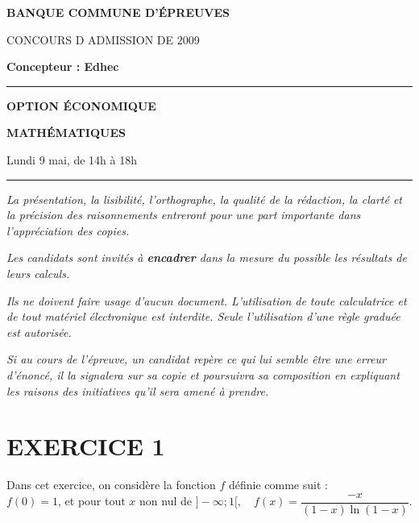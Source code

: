 \documentclass[11pt]{article}%
\begin{document}

\begin{center}
{\LARG\E\textbf{BANQUE COMMUNE D'ÉPREUVES}}



{\large \textsc{CONCOURS D ADMISSION DE 2009}}



{\large \textbf{Concepteur : Edhec}}



\rule{2.39cm}{0.05cm}



{\Large \textbf{OPTION ÉCONOMIQUE}}



{\Large \textbf{MATHÉMATIQUES }}



{\Large Lundi 9 mai, de 14h à 18h}



\rule{2.39cm}{0.05cm}
\end{center}

\textit{La présentation, la lisibilité, l'orthographe, la qualité
de la rédaction, la clarté et la précision des raisonnements
entreront pour une part importante dans l'appréciation des copies.}

\textit{Les candidats sont invités à \textbf{encadrer} dans la mesure
du possible les résultats de leurs calculs.}

\textit{Ils ne doivent faire usage d'aucun document. L'utilisation de
toute
calculatrice et de tout matériel électronique est interdite. Seule
l'utilisation d'une règle graduée est autorisée.}

\textit{Si au cours de l'épreuve, un candidat repère ce qui lui semble
être une erreur d'énoncé, il la signalera sur sa copie et
poursuivra sa composition en expliquant les raisons des initiatives
qu'il sera
amené à prendre.}

\vspace*{3cm}

\section*{EXERCICE 1}

Dans cet exercice, on considère la fonction $f$ définie comme suit :\\
$f(0) = 1$, et pour tout $x$ non nul de $]-\infty ;1[,\quad f(x) =
\dfrac{-x}{(1-x)\ln (1-x)}$.
\end{document}
